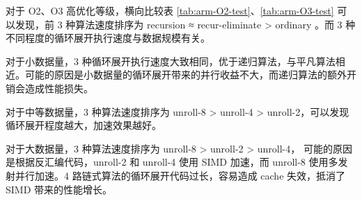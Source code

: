 \documentclass[a4paper]{article}
\begin{document}
对于 O2、O3 高优化等级，横向比较表 \ref{tab:arm-O2-test}、\ref{tab:arm-O3-test} 可以发现，前 3 种算法速度排序为
recursion ≈ recur-eliminate > ordinary 。而 3 种不同程度的循环展开执行速度与数据规模有关。

对于小数据量，3 种循环展开执行速度大致相同，优于递归算法，与平凡算法相近。可能的原因是小数据量的循环展开带来的并行收益不大，而递归算法的额外开销会造成性能损失。

对于中等数据量，3 种算法速度排序为 unroll-8 > unroll-4 > unroll-2，可以发现循环展开程度越大，加速效果越好。

对于大数据量，3 种算法速度排序为 unroll-8 > unroll-2 > unroll-4，
可能的原因是根据反汇编代码，unroll-2 和 unroll-4 使用 SIMD 加速，而 unroll-8 使用多发射并行加速。4 路链式算法的循环展开代码过长，容易造成 cache 失效，抵消了 SIMD 带来的性能增长。
\end{document}
